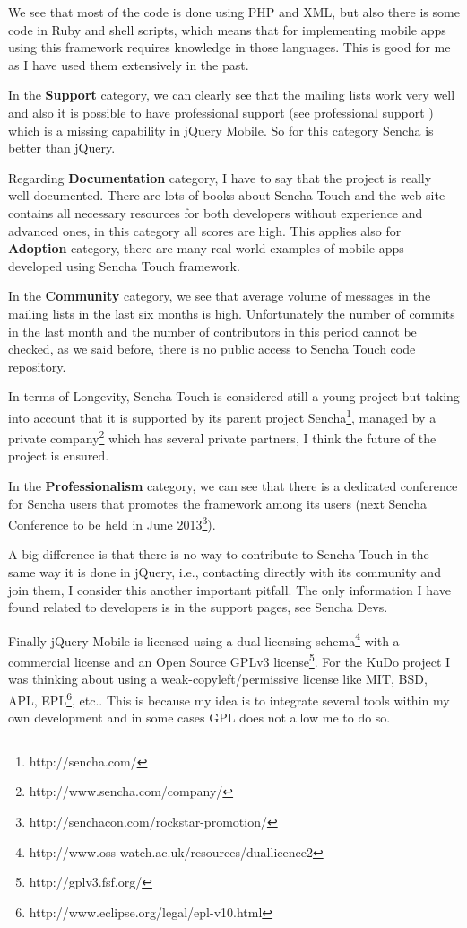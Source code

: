 \documentclass[a4paper,12pt]{book}
\begin{document}
We see that most of the code is done using PHP and XML, but also there is some code in Ruby and shell scripts, which means that for implementing mobile apps using this framework requires knowledge in those languages. This is good for me as I have used them extensively in the past.

In the \textbf{Support} category, we can clearly see that the mailing lists work very well and also it is possible to have professional support (see professional support \cite{sencha support}) which is a missing capability in jQuery Mobile. So for this category Sencha is better than jQuery.

Regarding \textbf{Documentation} category, I have to say that the project is really well-documented. There are lots of books about Sencha Touch and the web site contains all necessary resources for both developers without experience and advanced ones, in this category all scores are high. This applies also for \textbf{Adoption} category, there are many real-world examples of mobile apps developed using Sencha Touch framework.

In the \textbf{Community} category, we see that average volume of messages in the mailing lists in the last six months is high. Unfortunately the number of commits in the last month and the number of contributors in this period cannot be checked, as we said before, there is no public access to Sencha Touch code repository. 

In terms of Longevity, Sencha Touch is considered still a young project but taking into account that it is supported by its parent project Sencha\footnote{http://sencha.com/}, managed by a private company\footnote{http://www.sencha.com/company/}  which has several private partners, I think the future of the project is ensured.

In the \textbf{Professionalism} category, we can see that there is a dedicated conference for Sencha users\cite{sencha Conferences} that promotes the framework among its users  (next Sencha Conference to be held in June 2013\footnote{http://senchacon.com/rockstar-promotion/}).

A big difference is that there is no way to contribute to Sencha Touch in the same way it is done in jQuery, i.e., contacting directly with its community and join them, I consider this another important pitfall. The only information I have found related to developers is in the support pages, see Sencha Devs\cite{sencha Devs}.  

Finally jQuery Mobile is licensed using a dual licensing schema\footnote{http://www.oss-watch.ac.uk/resources/duallicence2}  with a commercial license and an Open Source GPLv3 license\footnote{http://gplv3.fsf.org/}. For the KuDo project I was thinking about using a weak-copyleft/permissive license like MIT, BSD, APL, EPL\footnote{http://www.eclipse.org/legal/epl-v10.html}, etc.. This is because my idea is to integrate several tools within my own development and in some cases GPL does not allow me to do so. 
\end{document}
